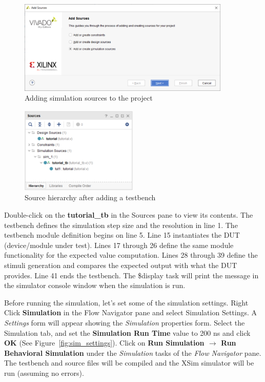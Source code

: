 \documentclass[11pt]{article}
\begin{document}
\begin{figure}[!h]
    \centering
    \includegraphics[width=0.9\textwidth]{images/add_tb.png}
    \caption{Adding simulation sources to the project}
    \label{fig:add_tb}
\end{figure}

\begin{figure}[!h]
    \centering
    \includegraphics[width=0.5\textwidth]{images/tb_hier.png}
    \caption{Source hierarchy after adding a testbench}
    \label{fig:tb_hier}
\end{figure}

Double-click on the \textbf{tutorial\_tb} in the Sources pane to view its contents. The testbench defines the simulation step size and the resolution in line 1. The testbench module definition begins on line 5. Line 15 instantiates the DUT (device/module under test). Lines 17 through 26 define the same module functionality for the expected value computation. Lines 28 through 39 define the stimuli generation and compares the expected output with what the DUT provides. Line 41 ends the testbench. The \$display task will print the message in the simulator console window when the simulation is run.

Before running the simulation, let's set some of the simulation settings. Right Click \textbf{Simulation} in the Flow Navigator pane and select Simulation Settings. A \textit{Settings} form will appear showing the \textit{Simulation} properties form. Select the Simulation tab, and set the \textbf{Simulation Run Time} value to 200 ns and click \textbf{OK} (See Figure~\ref{fig:sim_settings}). Click on \textbf{Run Simulation $\rightarrow$ Run Behavioral Simulation} under the \textit{Simulation} tasks of the \textit{Flow Navigator} pane. The testbench and source files will be compiled and the XSim simulator will be run (assuming no errors). 
\end{document}

